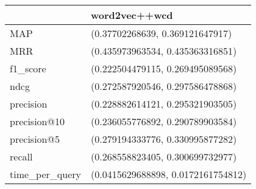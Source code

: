 \begin{tabular}{ll}
\toprule
{} &                       word2vec++wcd \\
\midrule
MAP            &     (0.37702268639, 0.369121647917) \\
MRR            &    (0.435973963534, 0.435363316851) \\
f1\_score       &    (0.222504479115, 0.269495089568) \\
ndcg           &    (0.272587920546, 0.297586478868) \\
precision      &    (0.228882614121, 0.295321903505) \\
precision@10   &    (0.236055776892, 0.290789903584) \\
precision@5    &    (0.279194333776, 0.330995877282) \\
recall         &    (0.268558823405, 0.300699732977) \\
time\_per\_query &  (0.0415629688898, 0.0172161754812) \\
\bottomrule
\end{tabular}
